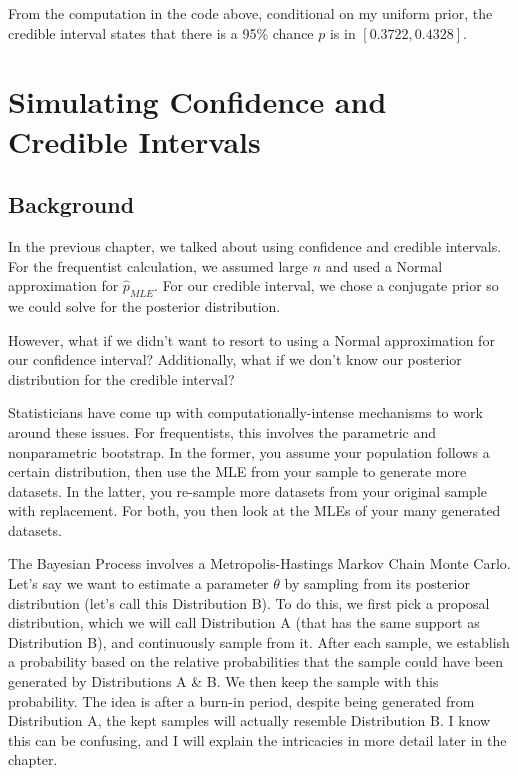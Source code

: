 \documentclass[
  letterpaper,
  DIV=11,
  numbers=noendperiod]{scrreprt}
\begin{document}
From the computation in the code above, conditional on my uniform prior,
the credible interval states that there is a 95\% chance \(p\) is in
\([0.3722, 0.4328]\).


\chapter{Simulating Confidence and Credible
Intervals}\label{simulating-confidence-and-credible-intervals}

\section{Background}\label{background-5}

In the previous chapter, we talked about using confidence and credible
intervals. For the frequentist calculation, we assumed large \(n\) and
used a Normal approximation for \(\hat{p}_{MLE}\). For our credible
interval, we chose a conjugate prior so we could solve for the posterior
distribution.

However, what if we didn't want to resort to using a Normal
approximation for our confidence interval? Additionally, what if we
don't know our posterior distribution for the credible interval?

Statisticians have come up with computationally-intense mechanisms to
work around these issues. For frequentists, this involves the parametric
and nonparametric bootstrap. In the former, you assume your population
follows a certain distribution, then use the MLE from your sample to
generate more datasets. In the latter, you re-sample more datasets from
your original sample with replacement. For both, you then look at the
MLEs of your many generated datasets.

The Bayesian Process involves a Metropolis-Hastings Markov Chain Monte
Carlo. Let's say we want to estimate a parameter \(\theta\) by sampling
from its posterior distribution (let's call this Distribution B). To do
this, we first pick a proposal distribution, which we will call
Distribution A (that has the same support as Distribution B), and
continuously sample from it. After each sample, we establish a
probability based on the relative probabilities that the sample could
have been generated by Distributions A \& B. We then keep the sample
with this probability. The idea is after a burn-in period, despite being
generated from Distribution A, the kept samples will actually resemble
Distribution B. I know this can be confusing, and I will explain the
intricacies in more detail later in the chapter.
\end{document}
